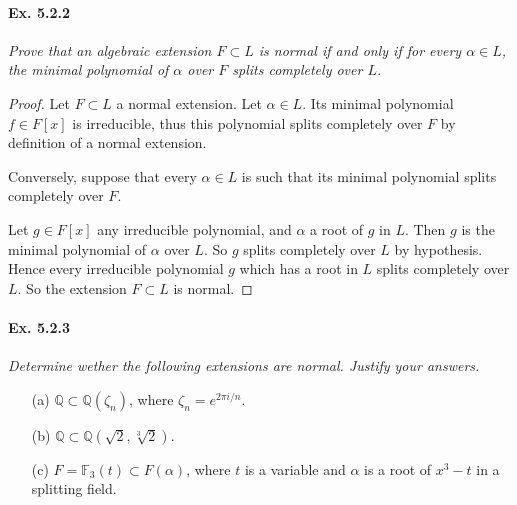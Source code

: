 \documentclass[11pt,a4paper]{article}
\newcommand{\Q}{\mathbb{Q}}
\newcommand{\F}{\mathbb{F}}
\begin{document}
\paragraph{Ex. 5.2.2}

{\it Prove that an algebraic extension $F\subset L$ is normal if and only if for every $\alpha \in L$, the minimal polynomial of $\alpha$ over $F$ splits completely over $L$.
}

\begin{proof}
Let $F\subset L $ a normal extension. Let $\alpha \in L$. Its minimal polynomial $f \in F[x]$ is irreducible, thus this polynomial splits completely over $F$ by definition of a normal extension.

Conversely, suppose that every $\alpha \in L$ is such that its minimal polynomial splits completely over $F$.

Let $g \in F[x]$ any irreducible polynomial, and $\alpha$ a root of $g$ in $L$. Then $g$ is the minimal polynomial of $\alpha$ over $L$. So $g$ splits completely over $L$ by hypothesis. Hence every irreducible polynomial  $g$ which has a root in $L$ splits completely over $L$. So the extension  $F\subset L$ is normal.
\end{proof}

\paragraph{Ex. 5.2.3}

{\it Determine wether the following extensions are normal. Justify your answers.
\begin{enumerate}
\item[(a)] $\Q \subset \Q(\zeta_n)$, where $\zeta_n = e^{2\pi i/n}$.
\item[(b)] $\Q \subset \Q(\sqrt{2},\sqrt[3]{2})$.
\item[(c)] $F = \F_3(t) \subset F(\alpha)$, where $t$ is a variable and $\alpha$ is a root of $x^3-t$ in a splitting field.
\end{enumerate}
}
\end{document}
